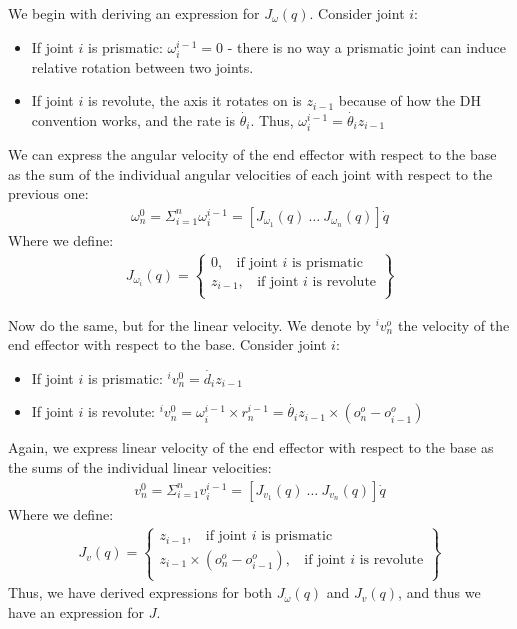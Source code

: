 \documentclass[../../master-handout.tex]{subfiles}
\begin{document}
We begin with deriving an expression for $J_\omega(q)$. Consider joint $i$:
\begin{itemize}
    \item If joint $i$ is prismatic: $\omega_i^{i-1} = 0$ - there is no way a prismatic joint can induce relative rotation between two joints.
    \item If joint $i$ is revolute, the axis it rotates on is $z_{i-1}$ because of how the DH convention works, and the rate is $\dot{\theta_i}$. Thus, $\omega_i^{i-1} = \dot{\theta_i} z_{i-1}$
\end{itemize}
We can express the angular velocity of the end effector with respect to the base as the sum of the individual angular velocities of each joint with respect to the previous one:
\begin{align*}
    \omega_n^0 = \Sigma_{i=1}^n \omega_i^{i-1} = [J_{\omega_1}(q) \ \dots \ J_{\omega_n}(q)] \dot{q}
\end{align*}
Where we define:
\begin{align*}
    J_{\omega_i}(q) = \left\{\begin{matrix}
0, \ \ \ \ \text{if joint $i$ is prismatic} \\
z_{i-1}, \ \ \ \ \text{if joint $i$ is revolute} \\ 
\end{matrix}\right\}
\end{align*}

Now do the same, but for the linear velocity. We denote by $^iv_n^o$ the velocity of the end effector with respect to the base. Consider joint $i$:
\begin{itemize}
    \item If joint $i$ is prismatic: $^iv_n^0 = \dot{d_i} z_{i-1}$
    \item If joint $i$ is revolute: $^iv_n^0 = \omega_i^{i-1} \times r_n^{i-1} = \dot{\theta_i} z_{i-1} \times (o_n^o - o_{i-1}^o)$
\end{itemize}
Again, we express linear velocity of the end effector with respect to the base as the sums of the individual linear velocities:
\begin{align*}
    v_n^0 = \Sigma_{i=1}^n v_i^{i-1} = [J_{v_1}(q) \ \dots \ J_{v_n}(q)] \dot{q}
\end{align*}
Where we define: 
\begin{align*}
J_{v}(q) = \left\{\begin{matrix}
z_{i-1}, \ \ \ \ \text{if joint $i$ is prismatic} \\
z_{i-1} \times (o_n^o - o_{i-1}^o), \ \ \ \ \text{if joint $i$ is revolute} \\ 
\end{matrix}\right\}
\end{align*}
Thus, we have derived expressions for both $J_{\omega}(q)$ and $J_v(q)$, and thus we have an expression for $J$.
\end{document}
